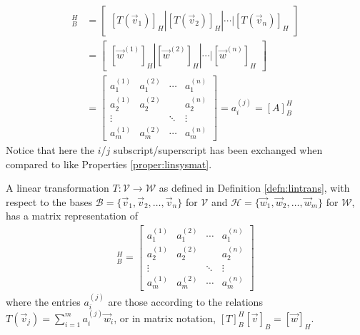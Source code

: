 \begin{align*}
[T]_B^H &= 
\begin{bmatrix}
[T(\vec{v}_1)]_H | [T(\vec{v}_2)]_H | \cdots | [T(\vec{v}_n)]_H
\end{bmatrix} \\
&=
\begin{bmatrix}
[\vec{w}^{(1)}]_H | [\vec{w}^{(2)}]_H | \cdots | [\vec{w}^{(n)}]_H
\end{bmatrix} \\
&= 
\begin{bmatrix}
a_1^{(1)} & a_1^{(2)} & \cdots & a_1^{(n)} \\
a_2^{(1)} & a_2^{(2)} &  & a_2^{(n)} \\
\vdots & & \ddots & \vdots \\
a_m^{(1)} & a_m^{(2)} & \cdots & a_m^{(n)}
\end{bmatrix}
= a_i^{(j)} = [A]_B^H
\end{align*}
Notice that here the $i$/$j$ subscript/superscript has been exchanged when compared to like Properties \ref{proper:linsysmat}.
\begin{defn}
\label{defn:matrixrepoflintrans}
A linear transformation $T: \mathcal{V} \to \mathcal{W}$ as defined in Definition \ref{defn:lintrans}, with respect to the bases $\mathcal{B} = \{\vec{v}_1, \vec{v}_2, \ldots, \vec{v}_n\}$ for $\mathcal{V}$ and $\mathcal{H} = \{\vec{w}_1, \vec{w}_2, \ldots, \vec{w}_m\}$ for $\mathcal{W}$, has a matrix representation of
\begin{align*}
[T]_B^H = 
\begin{bmatrix}
a_1^{(1)} & a_1^{(2)} & \cdots & a_1^{(n)} \\
a_2^{(1)} & a_2^{(2)} &  & a_2^{(n)} \\
\vdots & & \ddots & \vdots \\
a_m^{(1)} & a_m^{(2)} & \cdots & a_m^{(n)}
\end{bmatrix}
\end{align*}
where the entries $a_i^{(j)}$ are those according to the relations $T(\vec{v}_j) = \sum_{i=1}^{m} a_i^{(j)}\vec{w}_i$, or in matrix notation, $[T]_B^H [\vec{v}]_B = [\vec{w}]_H$.
\end{defn}

